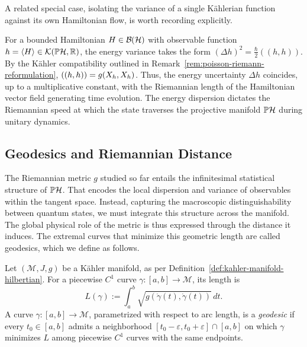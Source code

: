 \noindent A related special case, isolating the variance of a single Kählerian function against its own Hamiltonian flow, is worth recording explicitly.

\begin{example}
	For a bounded Hamiltonian $H \in \BH$ with observable function $h=\langle H\rangle \in \mathcal{K}(\PH, \R)$, the energy variance takes the form $(\Delta h)^2 = \frac{\hbar}{2}((h,h))$. By the Kähler compatibility outlined in Remark~\ref{rem:poisson-riemann-reformulation}, $((h,h)) = g(X_{h},X_{h})$. Thus, the energy uncertainty $\Delta h$ coincides, up to a multiplicative constant, with the Riemannian length of the Hamiltonian vector field generating time evolution. The energy dispersion dictates the Riemannian speed at which the state traverses the projective manifold $\PH$ during unitary dynamics.
\end{example}

\subsection*{Geodesics and Riemannian Distance}\label{sec:distinguish}

\noindent The Riemannian metric $g$ studied so far entails the infinitesimal statistical structure of $\PH$. That encodes the local dispersion and variance of observables within the tangent space. Instead, capturing the macroscopic distinguishability between quantum states, we must integrate this structure across the manifold. The global physical role of the metric is thus expressed through the distance it induces. The extremal curves that minimize this geometric length are called geodesics, which we define as follows.

\begin{definition}[Geodesic]
	\label{def:geodesic}
	Let $(\mathcal{M},J,g)$ be a Kähler manifold, as per Definition~\ref{def:kahler-manifold-hilbertian}. For a piecewise $C^1$ curve $\gamma:[a,b]\to\mathcal{M}$, its length is
	\begin{equation}
		L(\gamma):=\int_a^b\sqrt{g(\dot\gamma(t),\dot\gamma(t))}\,dt.
	\end{equation}
	A curve $\gamma:[a,b]\to\mathcal{M}$, parametrized with respect to arc
	length, is a \emph{geodesic} if every $t_0\in[a,b]$ admits a neighborhood
	$[t_0-\varepsilon,t_0+\varepsilon]\cap[a,b]$ on which $\gamma$ minimizes
	$L$ among piecewise $C^1$ curves with the same endpoints.
\end{definition}

